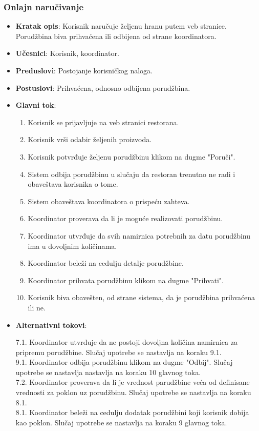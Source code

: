 \subsubsection{Onlajn naručivanje}
\begin{itemize}
    \item \textbf{Kratak opis}: Korisnik naručuje željenu hranu putem veb stranice. Porudžbina biva prihvaćena ili odbijena od strane koordinatora.
    \item \textbf{Učesnici}: Korisnik, koordinator.
    \item \textbf{Preduslovi}: Postojanje korisničkog naloga.
    \item \textbf{Postuslovi}: Prihvaćena, odnosno odbijena porudžbina.
    \item \textbf{Glavni tok}:
    \begin{enumerate}
        \item Korisnik se prijavljuje na veb stranici restorana.
        \item Korisnik vrši odabir željenih proizvoda.
        \item Korisnik potvrđuje željenu porudžbinu klikom na dugme "Poruči".
        \item Sistem odbija porudžbinu u slučaju da restoran trenutno ne radi i obaveštava korisnika o tome.
        \item Sistem obaveštava koordinatora o prispeću zahteva.
        \item Koordinator proverava da li je moguće realizovati porudžbinu.
        \item Koordinator utvrđuje da svih namirnica potrebnih za datu porudžbinu ima u dovoljnim količinama.
        \item Koordinator beleži na cedulju detalje porudžbine.
        \item Koordinator prihvata porudžbinu klikom na dugme "Prihvati".
        \item Korisnik biva obavešten, od strane sistema, da je porudžbina prihvaćena ili ne.
     \end{enumerate}
     \item \textbf{Alternativni tokovi}:
     
     7.1. Koordinator utvrđuje da ne postoji dovoljna količina namirnica za pripremu porudžbine. Slučaj upotrebe se nastavlja na koraku 9.1.\\
     9.1. Koordinator odbija porudžbinu klikom na dugme "Odbij". Slučaj upotrebe se nastavlja  nastavlja na koraku 10 glavnog toka.\\
     7.2. Koordinator proverava da li je vrednost parudžbine veća od definisane vrednosti za poklon uz porudžbinu. Slučaj upotrebe se nastavlja na koraku 8.1.\\
     8.1. Koordinator beleži na cedulju dodatak porudžbini koji korisnik dobija kao poklon. Slučaj upotrebe se nastavlja na koraku 9 glavnog toka.\\
    
\end{itemize}

